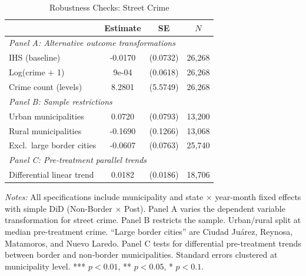 \begin{table}[htbp]
\centering
\caption{Robustness Checks: Street Crime}
\label{tab:robustness}
\begin{threeparttable}
\begin{tabular}{lccc}
\toprule
 & Estimate & SE & $N$ \\
\midrule
\multicolumn{4}{l}{\textit{Panel A: Alternative outcome transformations}} \\[3pt]
IHS (baseline) & -0.0170 & (0.0732) & 26,268 \\
Log(crime + 1) & 9e-04 & (0.0618) & 26,268 \\
Crime count (levels) & 8.2801 & (5.5749) & 26,268 \\
\midrule
\multicolumn{4}{l}{\textit{Panel B: Sample restrictions}} \\[3pt]
Urban municipalities & 0.0720 & (0.0793) & 13,200 \\
Rural municipalities & -0.1690 & (0.1266) & 13,068 \\
Excl.\ large border cities & -0.0607 & (0.0763) & 25,740 \\
\midrule
\multicolumn{4}{l}{\textit{Panel C: Pre-treatment parallel trends}} \\[3pt]
Differential linear trend & 0.0182 & (0.0186) & 18,706 \\
\bottomrule
\end{tabular}
\begin{tablenotes}[flushleft]\small
\item \textit{Notes:} All specifications include municipality and state $\times$ year-month fixed effects with simple DiD (Non-Border $\times$ Post). Panel A varies the dependent variable transformation for street crime. Panel B restricts the sample. Urban/rural split at median pre-treatment crime. ``Large border cities'' are Ciudad Ju\'arez, Reynosa, Matamoros, and Nuevo Laredo. Panel C tests for differential pre-treatment trends between border and non-border municipalities. Standard errors clustered at municipality level. *** $p<0.01$, ** $p<0.05$, * $p<0.1$.
\end{tablenotes}
\end{threeparttable}
\end{table}
